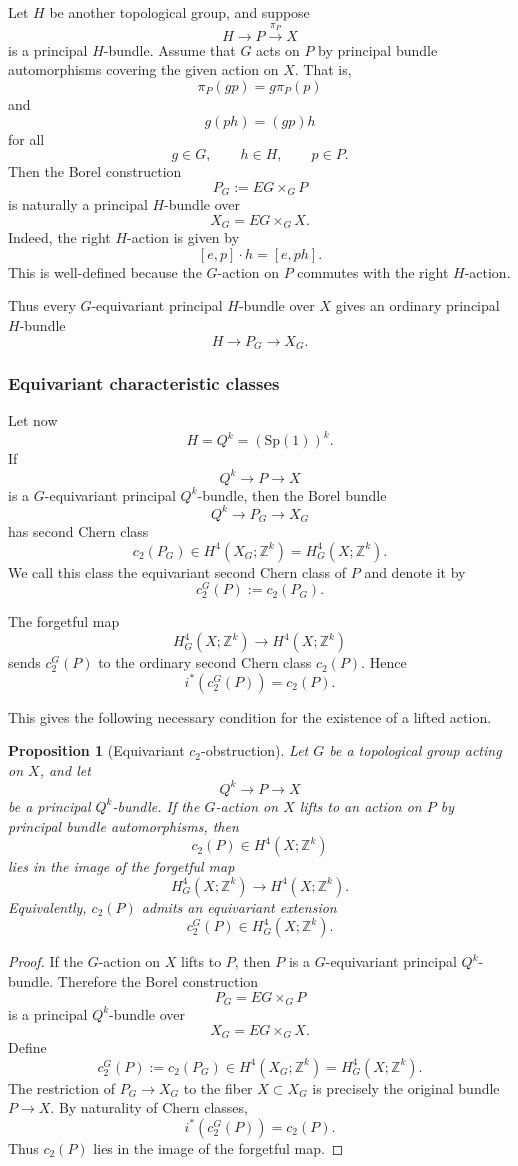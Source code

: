 \documentclass[11pt,a4paper]{article}
\numberwithin{equation}{section}
\newtheorem{prop}[definition]{Proposition}
\theoremstyle{named}
\begin{document}
Let \(H\) be another topological group, and suppose
\[
H\longrightarrow P\overset{\pi_P}{\longrightarrow} X
\]
is a principal \(H\)-bundle. Assume that \(G\) acts on \(P\) by principal bundle automorphisms covering the given action on \(X\). That is,
\[
\pi_P(gp)=g\pi_P(p)
\]
and
\[
g(ph)=(gp)h
\]
for all
\[
g\in G,\qquad h\in H,\qquad p\in P.
\]
Then the Borel construction
\[
P_G:=EG\times_G P
\]
is naturally a principal \(H\)-bundle over
\[
X_G=EG\times_G X.
\]
Indeed, the right \(H\)-action is given by
\[
[e,p]\cdot h=[e,ph].
\]
This is well-defined because the \(G\)-action on \(P\) commutes with the right \(H\)-action.

Thus every \(G\)-equivariant principal \(H\)-bundle over \(X\) gives an ordinary principal \(H\)-bundle
\[
H\longrightarrow P_G\longrightarrow X_G.
\]

\subsubsection{Equivariant characteristic classes}

Let now
\[
H=Q^k=(\text{Sp}(1))^k.
\]
If
\[
Q^k\longrightarrow P\longrightarrow X
\]
is a \(G\)-equivariant principal \(Q^k\)-bundle, then the Borel bundle
\[
Q^k\longrightarrow P_G\longrightarrow X_G
\]
has second Chern class
\[
c_2(P_G)\in H^4(X_G;\mathbb Z^k)=H_G^4(X;\mathbb Z^k).
\]
We call this class the equivariant second Chern class of \(P\) and denote it by
\[
c_2^G(P):=c_2(P_G).
\]

The forgetful map
\[
H_G^4(X;\mathbb Z^k)\longrightarrow H^4(X;\mathbb Z^k)
\]
sends \(c_2^G(P)\) to the ordinary second Chern class \(c_2(P)\). Hence
\[
i^*(c_2^G(P))=c_2(P).
\]

This gives the following necessary condition for the existence of a lifted action.

\begin{prop}[Equivariant \(c_2\)-obstruction]
\label{prop:equivariant-c2-obstruction}
Let \(G\) be a topological group acting on \(X\), and let
\[
Q^k\longrightarrow P\longrightarrow X
\]
be a principal \(Q^k\)-bundle. If the \(G\)-action on \(X\) lifts to an action on \(P\) by principal bundle automorphisms, then
\[
c_2(P)\in H^4(X;\mathbb Z^k)
\]
lies in the image of the forgetful map
\[
H_G^4(X;\mathbb Z^k)\longrightarrow H^4(X;\mathbb Z^k).
\]
Equivalently, \(c_2(P)\) admits an equivariant extension
\[
c_2^G(P)\in H_G^4(X;\mathbb Z^k).
\]
\end{prop}

\begin{proof}
If the \(G\)-action on \(X\) lifts to \(P\), then \(P\) is a \(G\)-equivariant principal \(Q^k\)-bundle. Therefore the Borel construction
\[
P_G=EG\times_G P
\]
is a principal \(Q^k\)-bundle over
\[
X_G=EG\times_G X.
\]
Define
\[
c_2^G(P):=c_2(P_G)\in H^4(X_G;\mathbb Z^k)=H_G^4(X;\mathbb Z^k).
\]
The restriction of \(P_G\to X_G\) to the fiber \(X\subset X_G\) is precisely the original bundle \(P\to X\). By naturality of Chern classes,
\[
i^*(c_2^G(P))=c_2(P).
\]
Thus \(c_2(P)\) lies in the image of the forgetful map.
\end{proof}
\end{document}
